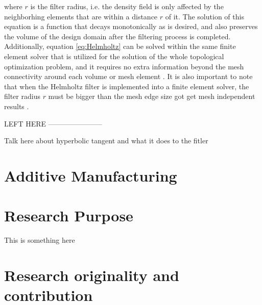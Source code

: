 \documentclass[../main.tex]{subfiles}
\begin{document}
where $r$ is the filter radius, i.e. the density field is only affected by the neighborhing elements that are within a distance $r$ of it. The solution of this equation is a function that decays monotonically as is desired, and also preserves the volume of the design domain after the filtering process is completed. Additionally, equation \ref{eq:Helmholtz} can be solved within the same finite element solver that is utilized for the solution of the whole topological optimization problem, and it requires no extra information beyond the mesh connectivity around each volume or mesh element \cite{lambeTopologyOptimizationUsing2018}. It is also important to note that when the Helmholtz filter is implemented into a finite element solver, the filter radius $r$ must be bigger than the mesh edge size got get mesh independent results \cite{PerformingTopologyOptimization}.



LEFT HERE -----------------------

Talk here about hyperbolic tangent and what it does to the fitler

\section{Additive Manufacturing}

\section{Research Purpose}
 
This is something here

\section{Research originality and contribution}
\end{document}
